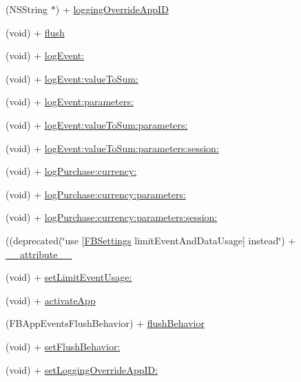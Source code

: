 \begin{DoxyCompactItemize}
(N\+S\+String $\ast$) + \hyperlink{interfaceFBAppEvents_a1aa76011dcc7ab662780b05cfcc65f38}{logging\+Override\+App\+ID}
\item 
(void) + \hyperlink{interfaceFBAppEvents_a0475c0b929152f9be2b7428312382747}{flush}
\item 
(void) + \hyperlink{interfaceFBAppEvents_a816373dd50bcf7381bf8194758ef8441}{log\+Event\+:}
\item 
(void) + \hyperlink{interfaceFBAppEvents_a9ac18622973fab340ecf25c63c933a34}{log\+Event\+:value\+To\+Sum\+:}
\item 
(void) + \hyperlink{interfaceFBAppEvents_a68b55bf0f5695fdf0089326473fcf4ea}{log\+Event\+:parameters\+:}
\item 
(void) + \hyperlink{interfaceFBAppEvents_a97a4a0a626b52abef16bdb3ea046b89e}{log\+Event\+:value\+To\+Sum\+:parameters\+:}
\item 
(void) + \hyperlink{interfaceFBAppEvents_a53a76d8d2b1245932bc89d55cdd247fa}{log\+Event\+:value\+To\+Sum\+:parameters\+:session\+:}
\item 
(void) + \hyperlink{interfaceFBAppEvents_a871b481d919104f7dbb67247b682e0fa}{log\+Purchase\+:currency\+:}
\item 
(void) + \hyperlink{interfaceFBAppEvents_aa77be4e60be97432ca9f6e3afe8d7b7f}{log\+Purchase\+:currency\+:parameters\+:}
\item 
(void) + \hyperlink{interfaceFBAppEvents_a96a5a1507cf439301bf5330339999777}{log\+Purchase\+:currency\+:parameters\+:session\+:}
\item 
((deprecated(\char`\"{}use \mbox{[}\hyperlink{interfaceFBSettings}{F\+B\+Settings} limit\+Event\+And\+Data\+Usage\mbox{]} instead\char`\"{}) + \hyperlink{interfaceFBAppEvents_a395c574fef6bbde5ac4b98b6cf497b8c}{\+\_\+\+\_\+attribute\+\_\+\+\_\+}
\item 
(void) + \hyperlink{interfaceFBAppEvents_a35ba571c101d4c2a051583f59ad433ab}{set\+Limit\+Event\+Usage\+:}
\item 
(void) + \hyperlink{interfaceFBAppEvents_a440fe60c1685ab36053ba18a190dd82e}{activate\+App}
\item 
(F\+B\+App\+Events\+Flush\+Behavior) + \hyperlink{interfaceFBAppEvents_af9b7ac67d5b3587f7dc452ba2129fe85}{flush\+Behavior}
\item 
(void) + \hyperlink{interfaceFBAppEvents_a0c6f0d165c7fba6eab71ff3228e9b848}{set\+Flush\+Behavior\+:}
\item 
(void) + \hyperlink{interfaceFBAppEvents_a3f9d06a1e8b3d482efc5c438827fbc6e}{set\+Logging\+Override\+App\+I\+D\+:}
\item 

\end{DoxyCompactItemize}
